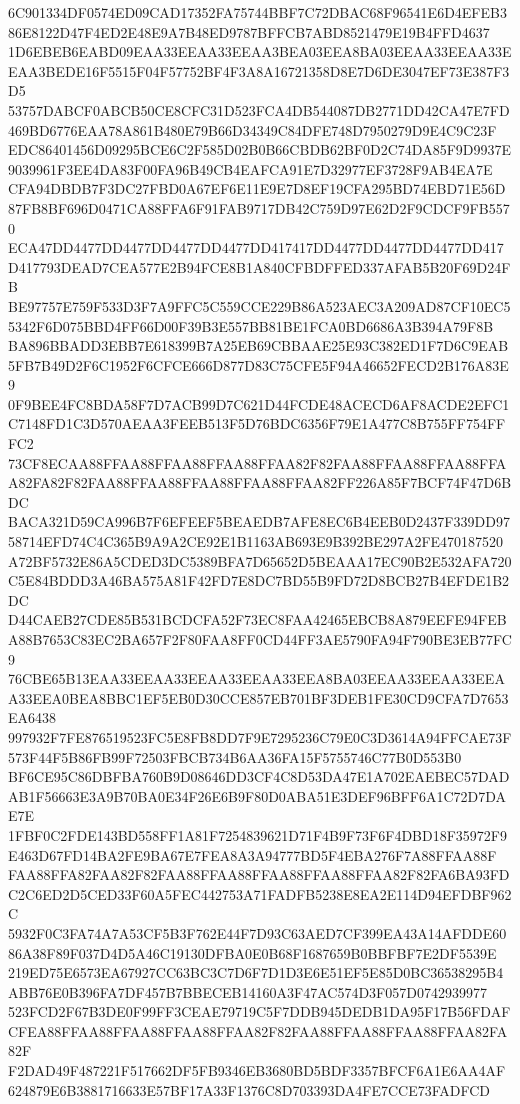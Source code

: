 \documentclass[UTF8,fontset=fandol,zihao=-4,a4paper]{ctexart}
\begin{document}
{{6C901334DF0574ED09CAD17352FA75744BBF7C72DBAC68F96541E6D4EFEB386E8122D47F4ED2E48E9A7B48ED9787BFFCB7ABD8521479E19B4FFD4637
1D6EBEB6EABD09EAA33EEAA33EEAA3BEA03EEA8BA03EEAA33EEAA33EEAA3BEDE16F5515F04F57752BF4F3A8A16721358D8E7D6DE3047EF73E387F3D5
53757DABCF0ABCB50CE8CFC31D523FCA4DB544087DB2771DD42CA47E7FD469BD6776EAA78A861B480E79B66D34349C84DFE748D7950279D9E4C9C23F
EDC86401456D09295BCE6C2F585D02B0B66CBDB62BF0D2C74DA85F9D9937E9039961F3EE4DA83F00FA96B49CB4EAFCA91E7D32977EF3728F9AB4EA7E
CFA94DBDB7F3DC27FBD0A67EF6E11E9E7D8EF19CFA295BD74EBD71E56D87FB8BF696D0471CA88FFA6F91FAB9717DB42C759D97E62D2F9CDCF9FB5570
ECA47DD4477DD4477DD4477DD4477DD417417DD4477DD4477DD4477DD417D417793DEAD7CEA577E2B94FCE8B1A840CFBDFFED337AFAB5B20F69D24FB
BE97757E759F533D3F7A9FFC5C559CCE229B86A523AEC3A209AD87CF10EC55342F6D075BBD4FF66D00F39B3E557BB81BE1FCA0BD6686A3B394A79F8B
BA896BBADD3EBB7E618399B7A25EB69CBBAAE25E93C382ED1F7D6C9EAB5FB7B49D2F6C1952F6CFCE666D877D83C75CFE5F94A46652FECD2B176A83E9
0F9BEE4FC8BDA58F7D7ACB99D7C621D44FCDE48ACECD6AF8ACDE2EFC1C7148FD1C3D570AEAA3FEEB513F5D76BDC6356F79E1A477C8B755FF754FFFC2
73CF8ECAA88FFAA88FFAA88FFAA88FFAA82F82FAA88FFAA88FFAA88FFAA82FA82F82FAA88FFAA88FFAA88FFAA88FFAA82FF226A85F7BCF74F47D6BDC
BACA321D59CA996B7F6EFEEF5BEAEDB7AFE8EC6B4EEB0D2437F339DD9758714EFD74C4C365B9A9A2CE92E1B1163AB693E9B392BE297A2FE470187520
A72BF5732E86A5CDED3DC5389BFA7D65652D5BEAAA17EC90B2E532AFA720C5E84BDDD3A46BA575A81F42FD7E8DC7BD55B9FD72D8BCB27B4EFDE1B2DC
D44CAEB27CDE85B531BCDCFA52F73EC8FAA42465EBCB8A879EEFE94FEBA88B7653C83EC2BA657F2F80FAA8FF0CD44FF3AE5790FA94F790BE3EB77FC9
76CBE65B13EAA33EEAA33EEAA33EEAA33EEA8BA03EEAA33EEAA33EEAA33EEA0BEA8BBC1EF5EB0D30CCE857EB701BF3DEB1FE30CD9CFA7D7653EA6438
997932F7FE876519523FC5E8FB8DD7F9E7295236C79E0C3D3614A94FFCAE73F573F44F5B86FB99F72503FBCB734B6AA36FA15F5755746C77B0D553B0
BF6CE95C86DBFBA760B9D08646DD3CF4C8D53DA47E1A702EAEBEC57DADAB1F56663E3A9B70BA0E34F26E6B9F80D0ABA51E3DEF96BFF6A1C72D7DAE7E
1FBF0C2FDE143BD558FF1A81F7254839621D71F4B9F73F6F4DBD18F35972F9E463D67FD14BA2FE9BA67E7FEA8A3A94777BD5F4EBA276F7A88FFAA88F
FAA88FFA82FAA82F82FAA88FFAA88FFAA88FFAA88FFAA82F82FA6BA93FDC2C6ED2D5CED33F60A5FEC442753A71FADFB5238E8EA2E114D94EFDBF962C
5932F0C3FA74A7A53CF5B3F762E44F7D93C63AED7CF399EA43A14AFDDE6086A38F89F037D4D5A46C19130DFBA0E0B68F1687659B0BBFBF7E2DF5539E
219ED75E6573EA67927CC63BC3C7D6F7D1D3E6E51EF5E85D0BC36538295B4ABB76E0B396FA7DF457B7BBECEB14160A3F47AC574D3F057D0742939977
523FCD2F67B3DE0F99FF3CEAE79719C5F7DDB945DEDB1DA95F17B56FDAFCFEA88FFAA88FFAA88FFAA88FFAA82F82FAA88FFAA88FFAA88FFAA82FA82F
F2DAD49F487221F517662DF5FB9346EB3680BD5BDF3357BFCF6A1E6AA4AF624879E6B3881716633E57BF17A33F1376C8D703393DA4FE7CCE73FADFCD
}}
\end{document}
